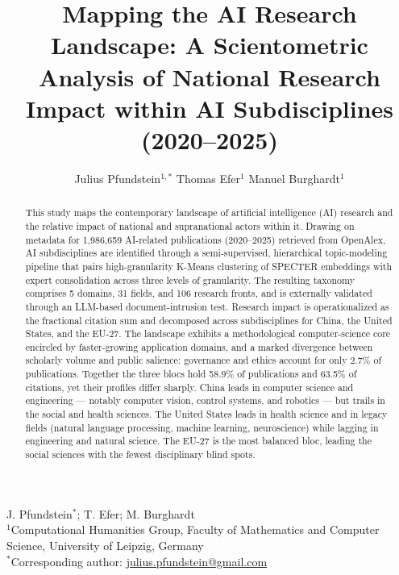 \documentclass{article}
\title{Mapping the AI Research Landscape: A Scientometric Analysis of National Research Impact within AI Subdisciplines (2020--2025)}
\author{Julius Pfundstein$^{1,\ast}$ \quad Thomas Efer$^{1}$ \quad Manuel Burghardt$^{1}$}
\date{}
\begin{document}
	
	\color{darkergray}
	
	\maketitle
	\thispagestyle{empty}
	
	\begin{center}
		{\footnotesize
			J. Pfundstein$^{\ast}$; T. Efer; M. Burghardt\\[0.3em]
			$^{1}$Computational Humanities Group, Faculty of Mathematics and Computer Science, University of Leipzig, Germany\\[0.3em]
			$^{\ast}$Corresponding author: \href{mailto:julius.pfundstein@gmail.com}{julius.pfundstein@gmail.com}
		}
	\end{center}
	
	\vspace{1em}
	
	\begin{abstract}
		\noindent This study maps the contemporary landscape of artificial intelligence (AI) research and the relative impact of national and supranational actors within it. Drawing on metadata for 1,986,659 AI-related publications (2020--2025) retrieved from OpenAlex, AI subdisciplines are identified through a semi-supervised, hierarchical topic-modeling pipeline that pairs high-granularity K-Means clustering of SPECTER embeddings with expert consolidation across three levels of granularity. The resulting taxonomy comprises 5 domains, 31 fields, and 106 research fronts, and is externally validated through an LLM-based document-intrusion test. Research impact is operationalized as the fractional citation sum and decomposed across subdisciplines for China, the United States, and the EU-27. The landscape exhibits a methodological computer-science core encircled by faster-growing application domains, and a marked divergence between scholarly volume and public salience: governance and ethics account for only 2.7\% of publications. Together the three blocs hold 58.9\% of publications and 63.5\% of citations, yet their profiles differ sharply. China leads in computer science and engineering --- notably computer vision, control systems, and robotics --- but trails in the social and health sciences. The United States leads in health science and in legacy fields (natural language processing, machine learning, neuroscience) while lagging in engineering and natural science. The EU-27 is the most balanced bloc, leading the social sciences with the fewest disciplinary blind spots.
	\end{abstract}
	
\end{document}
